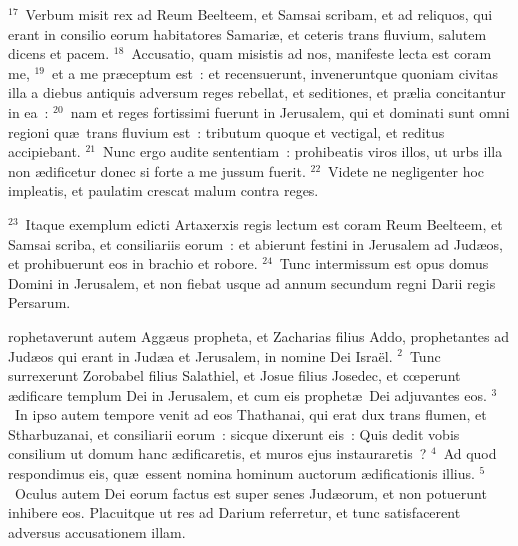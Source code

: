 ${}^{17}$~Verbum misit rex ad Reum Beelteem, et Samsai scribam, et ad reliquos, qui erant in consilio eorum habitatores Samari\ae , et ceteris trans fluvium, salutem dicens et pacem.
${}^{18}$~Accusatio, quam misistis ad nos, manifeste lecta est coram me,
${}^{19}$~et a me pr\ae ceptum est~: et recensuerunt, inveneruntque quoniam civitas illa a diebus antiquis adversum reges rebellat, et seditiones, et pr\ae lia concitantur in ea~:
${}^{20}$~nam et reges fortissimi fuerunt in Jerusalem, qui et dominati sunt omni regioni qu\ae\ trans fluvium est~: tributum quoque et vectigal, et reditus accipiebant.
${}^{21}$~Nunc ergo audite sententiam~: prohibeatis viros illos, ut urbs illa non \ae dificetur donec si forte a me jussum fuerit.
${}^{22}$~Videte ne negligenter hoc impleatis, et paulatim crescat malum contra reges.


${}^{23}$~Itaque exemplum edicti Artaxerxis regis lectum est coram Reum Beelteem, et Samsai scriba, et consiliariis eorum~: et abierunt festini in Jerusalem ad Jud\ae os, et prohibuerunt eos in brachio et robore.
${}^{24}$~Tunc intermissum est opus domus Domini in Jerusalem, et non fiebat usque ad annum secundum regni Darii regis Persarum.

\bchapter
{}rophetaverunt autem Agg\ae us propheta, et Zacharias filius Addo, prophetantes ad Jud\ae os qui erant in Jud\ae a et Jerusalem, in nomine Dei Isra\"el.
${}^{2}$~Tunc surrexerunt Zorobabel filius Salathiel, et Josue filius Josedec, et cœperunt \ae dificare templum Dei in Jerusalem, et cum eis prophet\ae\ Dei adjuvantes eos.
${}^{3}$~In ipso autem tempore venit ad eos Thathanai, qui erat dux trans flumen, et Stharbuzanai, et consiliarii eorum~: sicque dixerunt eis~: Quis dedit vobis consilium ut domum hanc \ae dificaretis, et muros ejus instauraretis~?
${}^{4}$~Ad quod respondimus eis, qu\ae\ essent nomina hominum auctorum \ae dificationis illius.
${}^{5}$~Oculus autem Dei eorum factus est super senes Jud\ae orum, et non potuerunt inhibere eos. Placuitque ut res ad Darium referretur, et tunc satisfacerent adversus accusationem illam.


